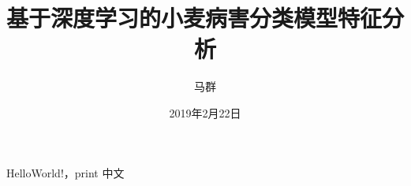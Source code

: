 \documentclass[UTF8]{article}
\title{基于深度学习的小麦病害分类模型特征分析}
\author{马群}
\date{2019年2月22日}
\begin{document}
    \maketitle
    \tableofcontents  %
    HelloWorld!，print 中文\\
    
\end{document}
